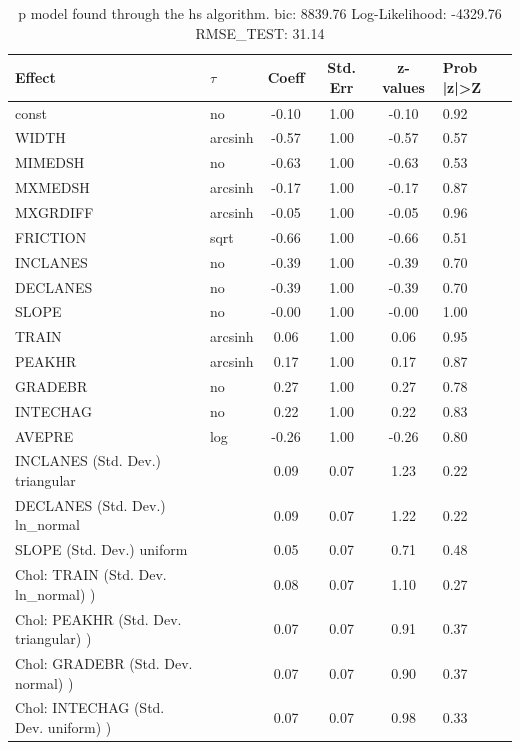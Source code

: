 \begin{table}
	\caption{p model found through the hs algorithm. bic: 8839.76 Log-Likelihood: -4329.76 RMSE_TEST: 31.14}
	\begin{center}
		\begin{tabular}{|l|l|c|c|c|l|}
			\hline
			Effect & $\tau$ & Coeff & Std. Err & z-values & Prob |z|>Z \\
			\hline
			const & no & -0.10 & 1.00 & -0.10 & 0.92 \\
			\hline
			WIDTH & arcsinh & -0.57 & 1.00 & -0.57 & 0.57 \\
			\hline
			MIMEDSH & no & -0.63 & 1.00 & -0.63 & 0.53 \\
			\hline
			MXMEDSH & arcsinh & -0.17 & 1.00 & -0.17 & 0.87 \\
			\hline
			MXGRDIFF & arcsinh & -0.05 & 1.00 & -0.05 & 0.96 \\
			\hline
			FRICTION & sqrt & -0.66 & 1.00 & -0.66 & 0.51 \\
			\hline
			INCLANES & no & -0.39 & 1.00 & -0.39 & 0.70 \\
			\hline
			DECLANES & no & -0.39 & 1.00 & -0.39 & 0.70 \\
			\hline
			SLOPE & no & -0.00 & 1.00 & -0.00 & 1.00 \\
			\hline
			TRAIN & arcsinh & 0.06 & 1.00 & 0.06 & 0.95 \\
			\hline
			PEAKHR & arcsinh & 0.17 & 1.00 & 0.17 & 0.87 \\
			\hline
			GRADEBR & no & 0.27 & 1.00 & 0.27 & 0.78 \\
			\hline
			INTECHAG & no & 0.22 & 1.00 & 0.22 & 0.83 \\
			\hline
			AVEPRE & log & -0.26 & 1.00 & -0.26 & 0.80 \\
			\hline
			INCLANES (Std. Dev.) triangular &  & 0.09 & 0.07 & 1.23 & 0.22 \\
			\hline
			DECLANES (Std. Dev.) ln_normal &  & 0.09 & 0.07 & 1.22 & 0.22 \\
			\hline
			SLOPE (Std. Dev.) uniform &  & 0.05 & 0.07 & 0.71 & 0.48 \\
			\hline
			 Chol: TRAIN (Std. Dev. ln_normal) ) &  & 0.08 & 0.07 & 1.10 & 0.27 \\
			\hline
			 Chol: PEAKHR (Std. Dev. triangular) ) &  & 0.07 & 0.07 & 0.91 & 0.37 \\
			\hline
			 Chol: GRADEBR (Std. Dev. normal) ) &  & 0.07 & 0.07 & 0.90 & 0.37 \\
			\hline
			 Chol: INTECHAG (Std. Dev. uniform) ) &  & 0.07 & 0.07 & 0.98 & 0.33 \\

\end{tabular}
\end{center}
\end{table}
